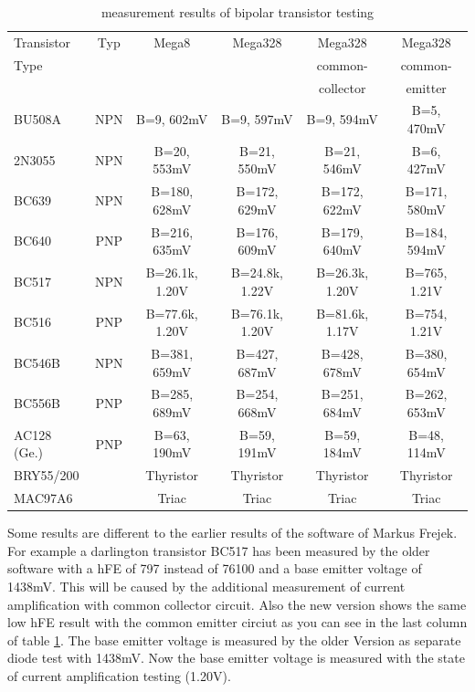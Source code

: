 \begin{table}[H]
  \begin{center}
    \begin{tabular}{| l | c | c | c | c | c |}
    \hline
 Transistor & Typ & Mega8           & Mega328        & Mega328         & Mega328 \\
    Type     &     &                 &                & common-         & common- \\
            &     &                 &                & collector       & emitter \\
    \hline
    \hline
BU508A      & NPN & B=9, 602mV      &  B=9, 597mV    &   B=9, 594mV    & B=5, 470mV \\
    \hline
2N3055      & NPN & B=20, 553mV     &  B=21, 550mV   &   B=21, 546mV   & B=6, 427mV \\
    \hline
BC639       & NPN & B=180, 628mV    &  B=172, 629mV  &   B=172, 622mV  & B=171, 580mV \\
    \hline
BC640       & PNP & B=216, 635mV    &  B=176, 609mV  &   B=179, 640mV  & B=184, 594mV \\
    \hline
BC517       & NPN & B=26.1k, 1.20V  &  B=24.8k, 1.22V&   B=26.3k, 1.20V & B=765, 1.21V \\
    \hline
BC516       & PNP & B=77.6k, 1.20V  &  B=76.1k, 1.20V&   B=81.6k, 1.17V & B=754, 1.21V \\
    \hline
BC546B      & NPN & B=381, 659mV    &  B=427, 687mV  &   B=428, 678mV   & B=380, 654mV \\
    \hline
BC556B      & PNP & B=285, 689mV    &  B=254, 668mV  &   B=251, 684mV   & B=262, 653mV \\
    \hline
AC128 (Ge.) & PNP & B=63, 190mV     &  B=59, 191mV   &   B=59, 184mV    & B=48, 114mV \\
    \hline
BRY55/200   &     & Thyristor       & Thyristor      &  Thyristor       & Thyristor \\
    \hline
MAC97A6     &     & Triac           & Triac          &  Triac           & Triac     \\
    \hline
    \end{tabular}
  \end{center}
  \caption{measurement results of bipolar transistor testing}
  \label{tab:bipolar} 
\end{table}

Some results are different to the earlier results of the software of Markus Frejek.
For example a darlington transistor BC517 has been measured by the older software
with a hFE of 797 instead of 76100 and a base emitter voltage of 1438mV.
This will be caused by the additional measurement of current amplification with common collector circuit.
Also the new version shows the same low hFE result with the common emitter circiut as you can see in the last column
of table \ref{tab:bipolar}.
The base emitter voltage is measured by the older Version as separate diode test with 1438mV.
Now the base emitter voltage is measured with the state of current amplification testing (1.20V).

